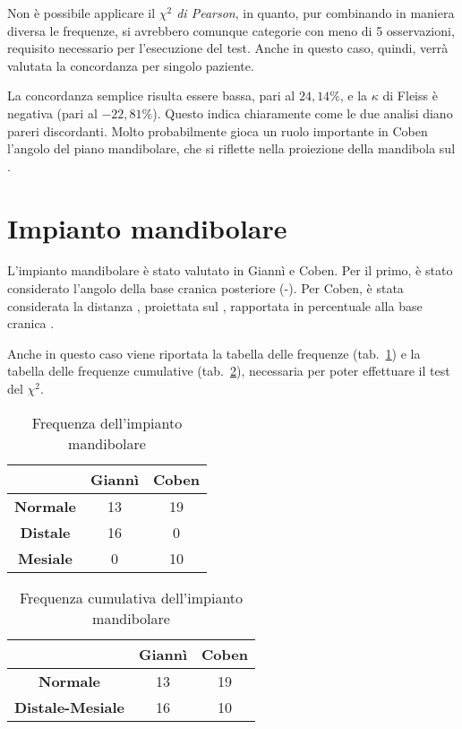 Non è possibile applicare il \emph{$\chi^2$ di Pearson}, in quanto, pur combinando in maniera diversa le frequenze, si avrebbero comunque categorie con meno di 5 osservazioni, requisito necessario per l'esecuzione del test. Anche in questo caso, quindi, verrà valutata la concordanza per singolo paziente.

La concordanza semplice risulta essere bassa, pari al $24,14\%$, e la $\kappa$ di Fleiss è negativa (pari al $-22,81\%$). Questo indica chiaramente come le due analisi diano pareri discordanti. Molto probabilmente gioca un ruolo importante in Coben l'angolo del piano mandibolare, che si riflette nella proiezione della mandibola sul .

\section{Impianto mandibolare}
L'impianto mandibolare è stato valutato in Giannì e Coben. Per il primo, è stato considerato l'angolo della base cranica posteriore (-). Per Coben, è stata considerata la distanza , proiettata sul , rapportata in percentuale alla base cranica .

Anche in questo caso viene riportata la tabella delle frequenze (tab.~\ref{tab:impianto_mandibolare_frequenze}) e la tabella delle frequenze cumulative (tab.~\ref{tab:impianto_mandibolare_frequenze_cumulative}), necessaria per poter effettuare il test del $\chi^2$.

\begin{table}[ht]
\centering
\caption{Frequenza dell'impianto mandibolare}
\label{tab:impianto_mandibolare_frequenze}
\begin{tabular}{>{\bfseries}ccc}
\toprule
 & \textbf{Giannì} & \textbf{Coben} \\
\midrule
Normale & 13 & 19 \\
Distale & 16 & 0 \\
Mesiale & 0 & 10 \\
\bottomrule
\end{tabular}
\end{table}

\begin{table}[ht]
\centering
\caption{Frequenza cumulativa dell'impianto mandibolare}
\label{tab:impianto_mandibolare_frequenze_cumulative}
\begin{tabular}{>{\bfseries}ccc}
\toprule
 & \textbf{Giannì} & \textbf{Coben} \\
\midrule
Normale & 13 & 19 \\
Distale-Mesiale & 16 & 10 \\
\bottomrule
\end{tabular}
\end{table}

